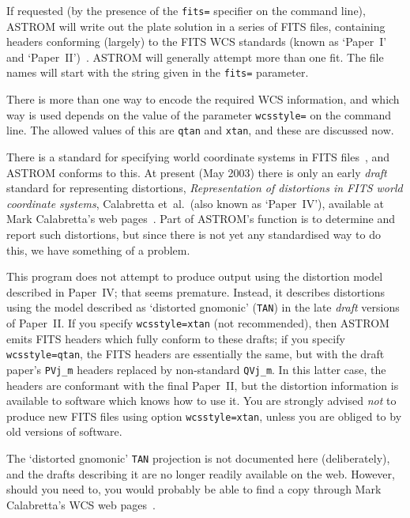 \documentclass[twoside,11pt]{article}
\renewcommand{\_}{\texttt{\symbol{95}}}
\begin{document}
If requested (by the presence of the \texttt{fits=} specifier on the
command line), ASTROM will write out the plate solution in a series of
FITS files, containing headers conforming (largely) to the FITS WCS
standards (known as `Paper~I' and
`Paper~II')~\cite{fitswcs1,fitswcs2}.  ASTROM will generally attempt
more than one fit.  The file names will start with the string given in
the \texttt{fits=} parameter.

There is more than one way to encode the required WCS information, and
which way is used depends on the value of the parameter
\texttt{wcsstyle=} on the command line.  The allowed values of this
are \texttt{qtan} and \texttt{xtan}, and these are discussed now.

There is a standard for specifying world coordinate systems in FITS
files~\cite{fitswcs2}, and ASTROM conforms to this.  At present (May
2003) there is only an early \emph{draft} standard for representing
distortions, \emph{Representation of distortions in FITS world
coordinate systems}, Calabretta et~al.\ (also known as `Paper~IV'),
available at Mark Calabretta's web pages~\cite{fitswcsurl}.  Part of
ASTROM's function is to determine and report such distortions, but
since there is not yet any standardised way to do this, we have
something of a problem.

This program does not attempt to produce output using the distortion
model described in Paper~IV; that seems premature.  Instead, it
describes distortions using the model described as `distorted
gnomonic' (\texttt{TAN}) in the late \emph{draft} versions of
Paper~II.  If you specify \texttt{wcsstyle=xtan} (not recommended),
then ASTROM emits FITS headers which fully conform to these drafts; if
you specify \texttt{wcsstyle=qtan}, the FITS headers are essentially
the same, but with the draft paper's \verb|PVj_m| headers
replaced by non-standard \verb|QVj_m|.  In this latter
case, the headers are conformant with the final Paper~II, but the
distortion information is available to software which knows how to use
it.  You are strongly advised \emph{not} to produce new FITS files
using option
\texttt{wcsstyle=xtan}, unless you are obliged to by old versions of
software.

The `distorted gnomonic' \texttt{TAN} projection is not documented
here (deliberately), and the drafts describing it are no longer
readily available on the web.  However, should you need to, you would
probably be able to find a copy through Mark Calabretta's WCS web
pages~\cite{fitswcsurl}.
\end{document}
